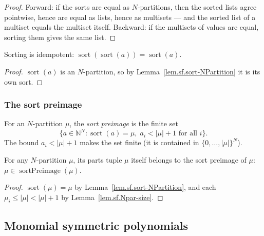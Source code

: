 \begin{proof}
Forward: if the sorts are equal as $N$-partitions, then the sorted lists agree pointwise,
hence are equal as lists, hence as multisets --- and the sorted list of a multiset equals
the multiset itself.
Backward: if the multisets of values are equal, sorting them gives the same list.
\end{proof}

\begin{lemma}
\label{lem.sf.sort-idempotent}
\leanhelper
\leanok
Sorting is idempotent: $\operatorname{sort}(\operatorname{sort}(a)) = \operatorname{sort}(a)$.
\end{lemma}

\begin{proof}
\leanok
$\operatorname{sort}(a)$ is an $N$-partition, so by Lemma~\ref{lem.sf.sort-NPartition}
it is its own sort.
\end{proof}

\subsubsection{The sort preimage}

\begin{definition}
\label{def.sf.sortPreimage}
\leanhelper
\leanok
For an $N$-partition $\mu$, the \emph{sort preimage} is the finite set
\[
\{a \in \mathbb{N}^N : \operatorname{sort}(a) = \mu,\; a_i < |\mu| + 1 \text{ for all } i\}.
\]
The bound $a_i < |\mu| + 1$ makes the set finite (it is contained in $\{0, \ldots, |\mu|\}^N$).
\end{definition}

\begin{lemma}
\label{lem.sf.parts-mem-sortPreimage}
\leanhelper
\leanok
For any $N$-partition $\mu$, its parts tuple $\mu$ itself belongs to the sort preimage
of $\mu$: $\mu \in \operatorname{sortPreimage}(\mu)$.
\end{lemma}

\begin{proof}
\leanok
$\operatorname{sort}(\mu) = \mu$ by Lemma~\ref{lem.sf.sort-NPartition}, and each
$\mu_i \leq |\mu| < |\mu| + 1$ by Lemma~\ref{lem.sf.Npar-size}.
\end{proof}

\subsection{Monomial symmetric polynomials}

